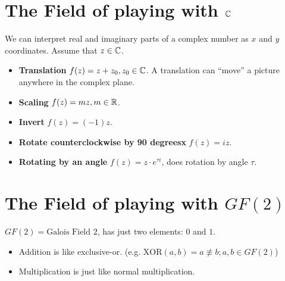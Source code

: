 \section{The Field of playing with ${\mathbb{C}}$}
We can interpret real and imaginary parts of a complex number as $x$ and $y$ coordinates. Assume that $z\in{\mathbb{C}}$.

\begin{itemize}
\item \textbf{Translation} $f(z) = z + z_0, z_0 \in {\mathbb{C}}$. A translation can ``move'' a picture anywhere in the complex plane.
\item \textbf{Scaling} $f(z) = mz, m \in \mathbb{R}$.
\item \textbf{Invert} $f(z) = (-1)z$.
\item \textbf{Rotate counterclockwise by 90 degreesx} $f(z) = iz$.
\item \textbf{Rotating by an angle} $f(z) = z \cdot e^{\tau i}$, does rotation by angle $\tau$.
\end{itemize}

\section{The Field of playing with $GF(2)$}
$GF(2) = \text{Galois Field 2}$, has just two elements: $0$ and $1$.
\begin{itemize}
\item Addition is like exclusive-or. (e.g. $\mathrm{XOR}(a, b) = a \not\equiv b ; a, b \in GF(2)$)
\item Multiplication is just like normal multiplication.
\end{itemize}

